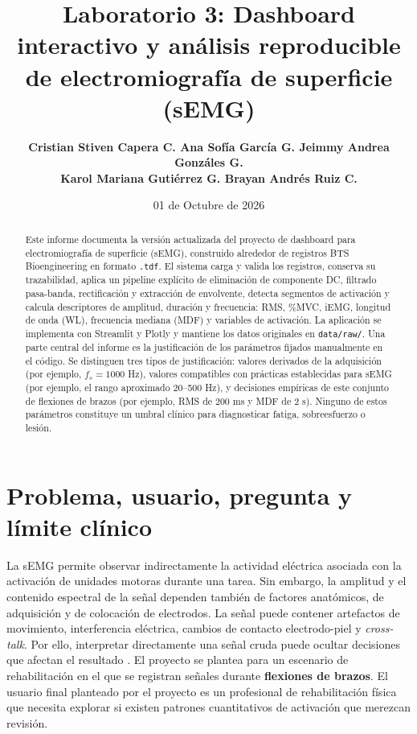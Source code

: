 \documentclass[11pt,spanish]{article}
\title{\textbf{\large Laboratorio 3: Dashboard interactivo y análisis reproducible\\de electromiografía de superficie (sEMG)}}
\author{\textbf{Cristian Stiven Capera C. \quad Ana Sofía García G. \quad Jeimmy Andrea Gonzáles G.}\\
\textbf{Karol Mariana Gutiérrez G. \quad Brayan Andrés Ruiz C.}}
\date{01 de Octubre de 2026}
\begin{document}
\maketitle

\begin{abstract}
Este informe documenta la versión actualizada del proyecto de dashboard para electromiografía de superficie (sEMG), construido alrededor de registros BTS Bioengineering en formato \texttt{.tdf}. El sistema carga y valida los registros, conserva su trazabilidad, aplica un pipeline explícito de eliminación de componente DC, filtrado pasa-banda, rectificación y extracción de envolvente, detecta segmentos de activación y calcula descriptores de amplitud, duración y frecuencia: RMS, \%MVC, iEMG, longitud de onda (WL), frecuencia mediana (MDF) y variables de activación. La aplicación se implementa con Streamlit y Plotly y mantiene los datos originales en \texttt{data/raw/}. 
Una parte central del informe es la justificación de los parámetros fijados manualmente en el código. Se distinguen tres tipos de justificación: valores derivados de la adquisición (por ejemplo, $f_s=1000$ Hz), valores compatibles con prácticas establecidas para sEMG (por ejemplo, el rango aproximado 20--500 Hz), y decisiones empíricas de este conjunto de flexiones de brazos (por ejemplo, RMS de 200 ms y MDF de 2 s). Ninguno de estos parámetros constituye un umbral clínico para diagnosticar fatiga, sobreesfuerzo o lesión.
\end{abstract}

\section{Problema, usuario, pregunta y límite clínico}

La sEMG permite observar indirectamente la actividad eléctrica asociada con la activación de unidades motoras durante una tarea. Sin embargo, la amplitud y el contenido espectral de la señal dependen también de factores anatómicos, de adquisición y de colocación de electrodos. La señal puede contener artefactos de movimiento, interferencia eléctrica, cambios de contacto electrodo-piel y \textit{cross-talk}. Por ello, interpretar directamente una señal cruda puede ocultar decisiones que afectan el resultado \cite{hug2020,defreitas2020}.
El proyecto se plantea para un escenario de rehabilitación en el que se registran señales durante \textbf{flexiones de brazos}. El usuario final planteado por el proyecto es un profesional de rehabilitación física que necesita explorar si existen patrones cuantitativos de activación que merezcan revisión.
\end{document}
